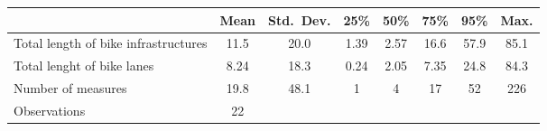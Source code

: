 {
\def\sym#1{\ifmmode^{#1}\else\(^{#1}\)\fi}
\begin{tabular}{l*{1}{ccccccc}}
\toprule
                    &        Mean&  Std.\ Dev.&        25\%&        50\%&        75\%&        95\%&        Max.\\
\midrule
Total length of bike infrastructures&        11.5&        20.0&        1.39&        2.57&        16.6&        57.9&        85.1\\
Total lenght of bike lanes&        8.24&        18.3&        0.24&        2.05&        7.35&        24.8&        84.3\\
Number of measures  &        19.8&        48.1&           1&           4&          17&          52&         226\\
\midrule
Observations        &          22&            &            &            &            &            &            \\
\bottomrule
\end{tabular}
}
